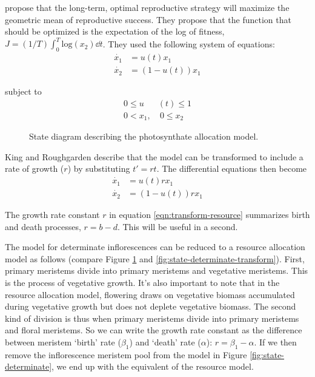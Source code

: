 \documentclass[12pt, oneside]{article}   	%
\begin{document}
\cite{King1982a} propose that the long-term, optimal reproductive strategy will maximize the geometric mean of reproductive success. They propose that the function that should be optimized is the expectation of the log of fitness, $ J = (1/T) \int_{0}^{T} \mathrm{log}(x_2) \dd {t}$. They used the following system of equations:
%
\begin{align}
\dot{x_1} & = u(t) x_1 \nonumber \\
\dot{x_2} & = (1-u(t)) x_1 
\label{eqn:de-resource}
\end{align}

\noindent subject to
%
\begin{align}
0 \leq u&(t)  \leq 1 \nonumber \\
0  < x_1,&\ 0  \leq x_2 
\label{eqn:constraints-resource}
\end{align}

\begin{figure}[!h]
\centering
{}
  \caption{State diagram describing the photosynthate allocation model.}
  \label{fig:state-resource}
\end{figure}

\iffalse
King and Roughgarden describe that the model can be transformed to include a rate of growth ($r$) by substituting $t' = rt$. The differential equations then become
%
\begin{align}
\dot{x_1} & = u(t) r x_1 \nonumber \\
\dot{x_2} & = (1-u(t)) r x_1 
\label{eqn:transform-resource}
\end{align}

The growth rate constant $r$ in equation \ref{eqn:transform-resource} summarizes birth and death processes, $r = b - d$. This will be useful in a second. 

The model for determinate inflorescences can be reduced to a resource allocation model as follows (compare Figure \ref{fig:state-resource} and \ref{fig:state-determinate-transform}). First, primary meristems divide into primary meristems and vegetative meristems. This is the process of vegetative growth. It's also important to note that in the resource allocation model, flowering draws on vegetative biomass accumulated during vegetative growth but does not deplete vegetative biomass. The second kind of division is thus when primary meristems divide into primary meristems and floral meristems. So we can write the growth rate constant as the difference between meristem `birth' rate ($\beta_1$) and `death' rate ($\alpha$): $r = \beta_1 - \alpha$. If we then remove the inflorescence meristem pool from the model in Figure \ref{fig:state-determinate}, we end up with the equivalent of the resource model. 
\end{document}
